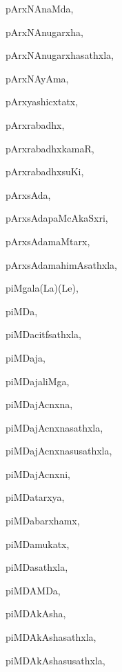 \begin{multicols}{3}
{\noindent
{pArxNAnaMda}, \pageref{pArxNAnaMda}

\noindent
{pArxNAnugarxha}, \pageref{pArxNAnugarxha}

\noindent
{pArxNAnugarxhasathxla}, \pageref{pArxNAnugarxhasathxla}

\noindent
{pArxNAyAma}, \pageref{pArxNAyAma}

\noindent
{pArxyashicxtatx}, \pageref{pArxyashicxtatx}

\noindent
{pArxrabadhx}, \pageref{pArxrabadhx}

\noindent
{pArxrabadhxkamaR}, \pageref{pArxrabadhxkamaR}

\noindent
{pArxrabadhxsuKi}, \pageref{pArxrabadhxsuKi}

\noindent
{pArxsAda}, \pageref{pArxsAda}

\noindent
{pArxsAdapaMcAkaSxri}, \pageref{pArxsAdapaMcAkaSxri}

\noindent
{pArxsAdamaMtarx}, \pageref{pArxsAdamaMtarx}

\noindent
{pArxsAdamahimAsathxla}, \pageref{pArxsAdamahimAsathxla}

\noindent
{piMgala(La)(Le)}, \pageref{piMgalaLaLe}

\noindent
{piMDa}, \pageref{piMDa}

\noindent
{piMDacitfsathxla}, \pageref{piMDacitfsathxla}

\noindent
{piMDaja}, \pageref{piMDaja}

\noindent
{piMDajaliMga}, \pageref{piMDajaliMga}

\noindent
{piMDajAcnxna}, \pageref{piMDajAcnxna}

\noindent
{piMDajAcnxnasathxla}, \pageref{piMDajAcnxnasathxla}

\noindent
{piMDajAcnxnasusathxla}, \pageref{piMDajAcnxnasusathxla}

\noindent
{piMDajAcnxni}, \pageref{piMDajAcnxni}

\noindent
{piMDatarxya}, \pageref{piMDatarxya}

\noindent
{piMDabarxhamx}, \pageref{piMDabarxhamx}

\noindent
{piMDamukatx}, \pageref{piMDamukatx}

\noindent
{piMDasathxla}, \pageref{piMDasathxla}

\noindent
{piMDAMDa}, \pageref{piMDAMDa}

\noindent
{piMDAkAsha}, \pageref{piMDAkAsha}

\noindent
{piMDAkAshasathxla}, \pageref{piMDAkAshasathxla}

\noindent
{piMDAkAshasusathxla}, \pageref{piMDAkAshasusathxla}

}
\end{multicols}

